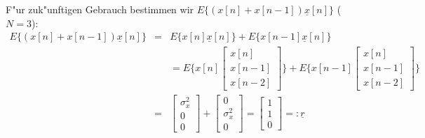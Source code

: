 F"ur zuk"unftigen Gebrauch bestimmen wir $E\{(x[n] + x[n-1]) \underline{x}[n]\}$ ($N=3$):
\begin{eqnarray}
 E\{(x[n] + x[n-1]) \underline{x}[n]\} & = & E\{x[n] \underline{x}[n]\} + E\{x[n-1] \underline{x}[n]\} \\
 & & = E\{x[n] \begin{bmatrix} x[n] \\ x[n-1] \\ x[n-2] \end{bmatrix}\} + E\{x[n-1] \begin{bmatrix} x[n] \\ x[n-1] \\ x[n-2] \end{bmatrix}\} \\
 & = & \begin{bmatrix} \sigma_x^2 \\ 0 \\ 0 \end{bmatrix} + \begin{bmatrix} 0 \\ \sigma_x^2 \\ 0 \end{bmatrix} = \begin{bmatrix} 1 \\ 1 \\ 0 \end{bmatrix} =: \underline{r}
\end{eqnarray}


